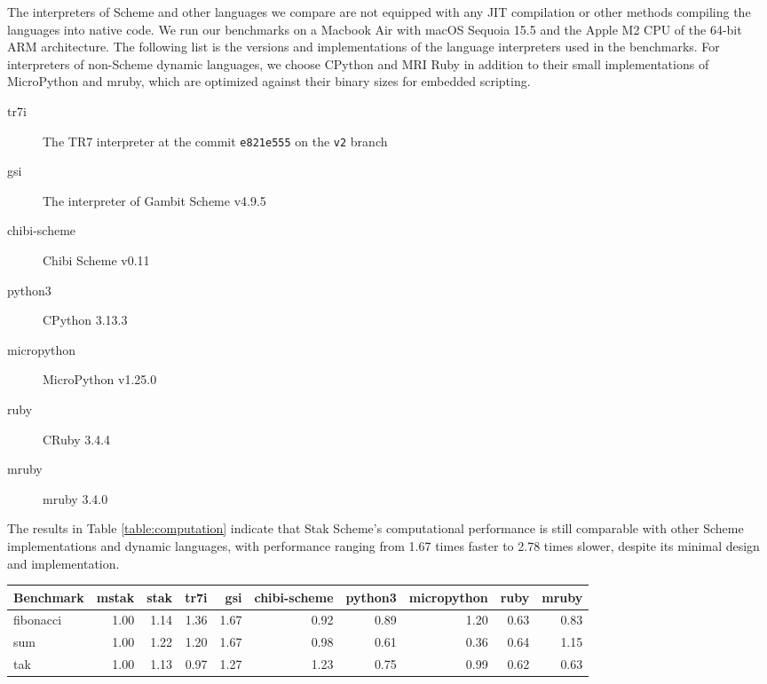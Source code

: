 \documentclass[sigplan]{acmart}
\begin{document}
The interpreters of Scheme and other languages we compare are not
equipped with
any JIT compilation or other methods compiling the languages into
native code.
We run our benchmarks on a Macbook Air with macOS Sequoia 15.5 and the Apple
M2 CPU of the 64-bit ARM architecture.
The following list is the versions and implementations of
the language interpreters used in the benchmarks.
For interpreters of non-Scheme dynamic languages, we choose CPython and
MRI Ruby in addition to their small implementations of MicroPython
and mruby, which are optimized against their binary sizes for
embedded scripting.

\begin{description}
  \item[tr7i] The TR7 interpreter at the commit \texttt{e821e555}
    on the \texttt{v2} branch
  \item[gsi] The interpreter of Gambit Scheme v4.9.5
  \item[chibi-scheme] Chibi Scheme v0.11
  \item[python3] CPython 3.13.3
  \item[micropython] MicroPython v1.25.0
  \item[ruby] CRuby 3.4.4
  \item[mruby] mruby 3.4.0
\end{description}

The results in Table \ref{table:computation} indicate that Stak
Scheme's computational performance is still comparable with other
Scheme implementations and dynamic languages, with performance
ranging from 1.67 times faster to 2.78 times slower,
despite its minimal design and implementation.

\begin{table*}
  \begin{center}
    \begin{tabular}{l|rrrrrrrrr}
      \hline
      Benchmark & mstak & stak & tr7i & gsi & chibi-scheme & python3
      & micropython & ruby & mruby \\
      \hline
      fibonacci & 1.00 & 1.14 & 1.36 & 1.67 & 0.92 & 0.89 & 1.20 &
      0.63 & 0.83 \\
      sum & 1.00 & 1.22 & 1.20 & 1.67 & 0.98 & 0.61 & 0.36 & 0.64 & 1.15 \\
      tak & 1.00 & 1.13 & 0.97 & 1.27 & 1.23 & 0.75 & 0.99 & 0.62 & 0.63 \\
      \hline
    \end{tabular}

    \caption{Computational benchmarks (relative time. lower is better.)}
    \label{table:computation}
  \end{center}
\end{table*}
\end{document}
